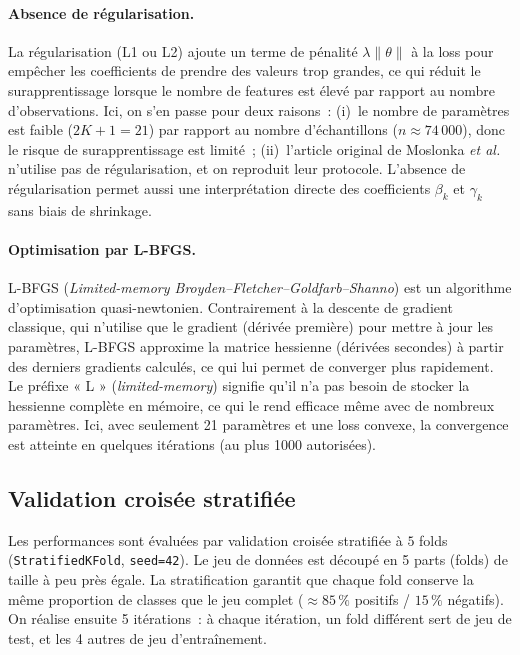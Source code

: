 \documentclass[11pt,a4paper]{article}
\begin{document}
\paragraph{Absence de régularisation.}
La régularisation (L1 ou L2) ajoute un terme de pénalité $\lambda \|\theta\|$ à la loss pour empêcher les coefficients de prendre des valeurs trop grandes, ce qui réduit le surapprentissage lorsque le nombre de features est élevé par rapport au nombre d'observations. Ici, on s'en passe pour deux raisons~: (i)~le nombre de paramètres est faible ($2K + 1 = 21$) par rapport au nombre d'échantillons ($n \approx 74\,000$), donc le risque de surapprentissage est limité~; (ii)~l'article original de Moslonka \emph{et al.} n'utilise pas de régularisation, et on reproduit leur protocole. L'absence de régularisation permet aussi une interprétation directe des coefficients $\beta_k$ et $\gamma_k$ sans biais de shrinkage.

\paragraph{Optimisation par L-BFGS.}
L-BFGS (\emph{Limited-memory Broyden--Fletcher--Goldfarb--Shanno}) est un algorithme d'optimisation quasi-newtonien. Contrairement à la descente de gradient classique, qui n'utilise que le gradient (dérivée première) pour mettre à jour les paramètres, L-BFGS approxime la matrice hessienne (dérivées secondes) à partir des derniers gradients calculés, ce qui lui permet de converger plus rapidement. Le préfixe « L » (\emph{limited-memory}) signifie qu'il n'a pas besoin de stocker la hessienne complète en mémoire, ce qui le rend efficace même avec de nombreux paramètres. Ici, avec seulement 21 paramètres et une loss convexe, la convergence est atteinte en quelques itérations (au plus 1000 autorisées).


\subsection{Validation croisée stratifiée}

Les performances sont évaluées par validation croisée stratifiée à $5$ folds (\texttt{StratifiedKFold}, \texttt{seed=42}). Le jeu de données est découpé en 5 parts (folds) de taille à peu près égale. La stratification garantit que chaque fold conserve la même proportion de classes que le jeu complet ($\approx 85\,\%$ positifs / $15\,\%$ négatifs). On réalise ensuite 5 itérations~: à chaque itération, un fold différent sert de jeu de test, et les 4 autres de jeu d'entraînement.
\end{document}
